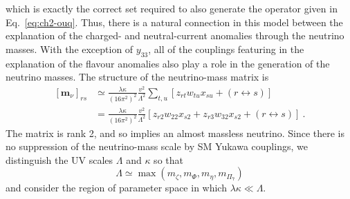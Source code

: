   which is exactly the correct set required to also generate the operator given
  in Eq.~\eqref{eq:ch2-ouq}. Thus, there is a natural connection in this model
  between the explanation of the charged- and neutral-current anomalies through
  the neutrino masses. With the exception of $y_{33}$, all of the couplings
  featuring in the explanation of the flavour anomalies also play a role in the
  generation of the neutrino masses. The structure of the neutrino-mass matrix
  is
  \begin{equation}
    \label{eq:ch2-flav-anom-mv}
    \begin{aligned}
      [\mathbf{m}_{\nu}]_{rs} &\simeq \frac{\lambda \kappa}{(16 \pi^{2})^{2}} \frac{v^{2}}{\Lambda^{2}} \sum_{t,u} [z_{rt} w_{tu} x_{su} + (r \leftrightarrow s)] \\
      &= \frac{\lambda \kappa}{(16 \pi^{2})^{2}} \frac{v^{2}}{\Lambda^{2}} [z_{r2} w_{22} x_{s2} + z_{r3}w_{32}x_{s2} + (r \leftrightarrow s)] \ .
    \end{aligned}
  \end{equation}
  The matrix is rank 2, and so implies an almost massless neutrino. Since there is no suppression of the neutrino-mass scale by SM Yukawa
  couplings, we distinguish the UV scales $\Lambda$ and $\kappa$ so that
  \begin{equation}
    \Lambda \simeq \max\left(m_{\zeta}, m_{\Phi}, m_{\eta}, m_{\Pi_{7}}\right)
  \end{equation}
  and consider the region of parameter space in which
  $\lambda \kappa \ll \Lambda$.

